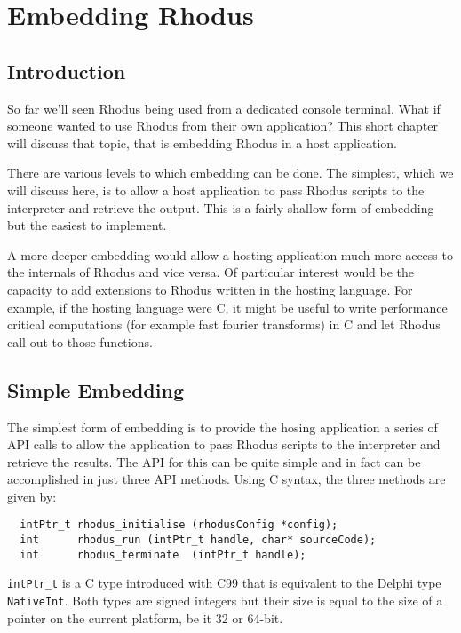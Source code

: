 {\bfseries\slshape\sffamily\color{ChapterTitleColor} \chapter{Embedding Rhodus}} \label{chap:hosable}

\section{Introduction}

So far we'll seen Rhodus being used from a dedicated console terminal. What if someone wanted to use Rhodus from their own application? This short chapter will discuss that topic, that is embedding Rhodus in a host application.

There are various levels to which embedding can be done. The simplest, which we will discuss here, is to allow a host application to pass Rhodus scripts to the interpreter and retrieve the output. This is a fairly shallow form of embedding but the easiest to implement.

A more deeper embedding would allow a hosting application much more access to the internals of Rhodus and vice versa. Of particular interest would be the capacity to add extensions to Rhodus written in the hosting language. For example, if the hosting language were C, it might be useful to write performance critical computations (for example fast fourier transforms) in C and let Rhodus call out to those functions.

\section{Simple Embedding}

The simplest form of embedding is to provide the hosing application a series of API calls to allow the application to pass Rhodus scripts to the interpreter and retrieve the results. The API for this can be quite simple and in fact can be accomplished in just three API methods. Using C syntax, the three methods are given by:

\begin{lstlisting}
  intPtr_t rhodus_initialise (rhodusConfig *config);
  int      rhodus_run (intPtr_t handle, char* sourceCode);
  int      rhodus_terminate  (intPtr_t handle);
\end{lstlisting}

{\tt intPtr_t} is a C type introduced with C99 that is equivalent to the Delphi type {\tt NativeInt}.  Both types are signed integers but their size is equal to the size of a pointer on the current platform, be it 32 or 64-bit.

